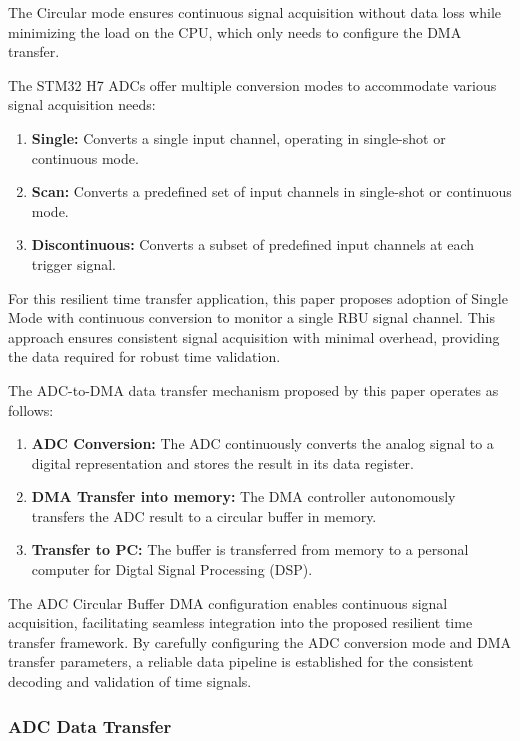 \documentclass[12pt, a4paper]{extarticle}
\begin{document}
The Circular mode ensures continuous signal acquisition without data loss while
minimizing the load on the CPU, which only needs to configure the DMA transfer.

The STM32 H7 ADCs offer multiple conversion modes to accommodate various signal
acquisition needs:

\begin{enumerate}[noitemsep]
    \item \textbf{Single:} Converts a single input channel, operating in
        single-shot or continuous mode.
    \item \textbf{Scan:} Converts a predefined set of input channels in
        single-shot or continuous mode.
    \item \textbf{Discontinuous:} Converts a subset of predefined input
        channels at each trigger signal.
\end{enumerate}

For this resilient time transfer application, this paper proposes adoption of
Single Mode with continuous conversion to monitor a single RBU signal channel.
This approach ensures consistent signal acquisition with minimal overhead,
providing the data required for robust time validation.

The ADC-to-DMA data transfer mechanism proposed by this paper operates as follows:

\begin{enumerate}[noitemsep]
    \item \textbf{ADC Conversion:} The ADC continuously converts the analog
        signal to a digital representation and stores the result in its data
        register.
    \item \textbf{DMA Transfer into memory:} The DMA controller autonomously transfers the
        ADC result to a circular buffer in memory.
    \item \textbf{Transfer to PC:} The buffer is transferred from memory to a personal
        computer for Digtal Signal Processing (DSP).
\end{enumerate}

The ADC Circular Buffer DMA configuration enables continuous signal
acquisition, facilitating seamless integration into the proposed resilient time
transfer framework. By carefully configuring the ADC conversion mode and DMA
transfer parameters, a reliable data pipeline is established for the consistent
decoding and validation of time signals.

\subsubsection{ADC Data Transfer}\label{section:adc-data-transfer}
\end{document}
